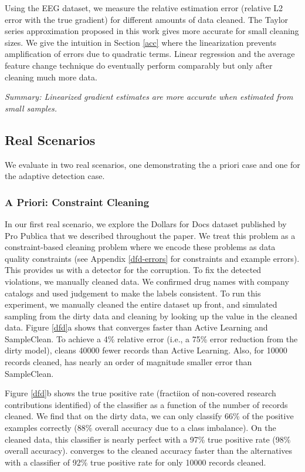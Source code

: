 Using the EEG dataset, we measure the relative estimation error (relative L2 error with the true gradient) for different amounts of data cleaned.
The Taylor series approximation proposed in this work gives more accurate for small cleaning sizes.
We give the intuition in Section \ref{acc} where the linearization prevents amplification of errors due to quadratic terms.
Linear regression and the average feature change technique do eventually perform comparably but only after cleaning much more data.

\vspace{0.25em}

\noindent \emph{Summary: Linearized gradient estimates are more accurate when estimated from small samples. }

\subsection{Real Scenarios}
We evaluate \sys in two real scenarios, one demonstrating the a priori case and one for the adaptive detection case.

\subsubsection{A Priori: Constraint Cleaning}\label{dfd-exp}
In our first real scenario, we explore the Dollars for Docs dataset published by Pro Publica that we described throughout the paper.
We treat this problem as a constraint-based cleaning problem where we encode these problems as data quality constraints (see Appendix \ref{dfd-errors} for constraints and example errors). 
This provides us with a detector for the corruption. 
To fix the detected violations, we manually cleaned data.
We confirmed drug names with company catalogs and used judgement to make the labels consistent.
To run this experiment, we manually cleaned the entire dataset up front, and simulated sampling from the dirty data and cleaning by looking up the value in the cleaned data.
Figure \ref{dfd}a shows that \sys converges faster than Active Learning and SampleClean.
To achieve a 4\% relative error (i.e., a 75\% error reduction from the dirty model), \sys cleans 40000 fewer records than Active Learning.
Also, for 10000 records cleaned, \sys has nearly an order of magnitude smaller error than SampleClean.

Figure \ref{dfd}b shows the true positive rate (fractiion of non-covered research contributions identified) of the classifier as a function of the number of records cleaned. 
We find that on the dirty data, we can only classify 66\% of the positive examples correctly (88\% overall accuracy due to a class imbalance).
On the cleaned data, this classifier is nearly perfect with a 97\% true positive rate (98\% overall accuracy).
\sys converges to the cleaned accuracy faster than the alternatives with a classifier of 92\% true positive rate for only 10000 records cleaned.

